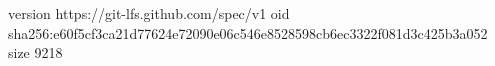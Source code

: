version https://git-lfs.github.com/spec/v1
oid sha256:e60f5cf3ca21d77624e72090e06c546e8528598cb6ec3322f081d3c425b3a052
size 9218
